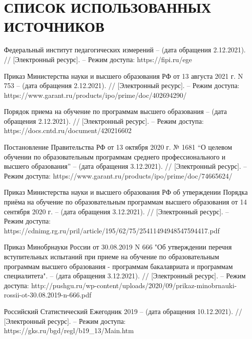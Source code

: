 \section*{СПИСОК ИСПОЛЬЗОВАННЫХ ИСТОЧНИКОВ}

\begingroup
\renewcommand{\section}[2]{}
\begin{thebibliography}{}

	Федеральный институт педагогических измерений – (дата обращения 2.12.2021). // [Электронный ресурс]. – Режим доступа: https://fipi.ru/ege

	Приказ Министерства науки и высшего образования РФ от 13 августа 2021 г. N 753  – (дата обращения 2.12.2021). // [Электронный ресурс]. – Режим доступа: https://www.garant.ru/products/ipo/prime/doc/402694290/

	Порядок приема на обучение по программам высшего образования  – (дата обращения 2.12.2021). // [Электронный ресурс]. – Режим доступа: https://docs.cntd.ru/document/420216602

	Постановление Правительства РФ от 13 октября 2020 г. № 1681 “О целевом обучении по образовательным программам среднего профессионального и высшего образования”  – (дата обращения 3.12.2021). // [Электронный ресурс]. – Режим доступа: https://www.garant.ru/products/ipo/prime/doc/74665624/

	Приказ Министерства науки и высшего образования РФ об утверждении Порядка приёма на обучение по образовательным программам высшего образования от 14 сентября 2020 г. – (дата обращения 3.12.2021). // [Электронный ресурс]. – Режим доступа: https://cdnimg.rg.ru/pril/article/195/62/75/25411494948547594417.pdf

	Приказ Минобрнауки России от 30.08.2019 N 666 "Об утверждении перечня вступительных испытаний при приеме на обучение по образовательным программам высшего образования - программам бакалавриата и программам специалитета". – (дата обращения 3.12.2021). // [Электронный ресурс]. – Режим доступа: http://pushgu.ru/wp-content/uploads/2020/09/prikaz-minobrnauki-rossii-ot-30.08.2019-n-666.pdf

	Российский Статистический Ежегодник 2019 – (дата обращения 10.12.2021). // [Электронный ресурс]. – Режим доступа: https://gks.ru/bgd/regl/b19\_13/Main.htm


\end{thebibliography}
